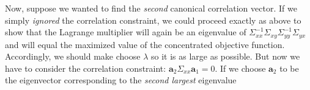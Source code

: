 \documentclass[12pt]{article}
\theoremstyle{definition}
\begin{document}
Now, suppose we wanted to find the \emph{second} canonical correlation vector. If we simply \emph{ignored} the correlation constraint, we could proceed exactly as above to show that the Lagrange multiplier will again be an eigenvalue of $\Sigma_{xx}^{-1}\Sigma_{xy}\Sigma_{yy}^{-1} \Sigma_{yx}$ and will equal the maximized value of the concentrated objective function. Accordingly, we should make choose $\lambda$ so it is as large as possible. But now we have to consider the correlation constraint: $\mathbf{a}_2 \Sigma_{xx}\mathbf{a}_1 = 0$. If we choose $\mathbf{a}_2$ to be the eigenvector corresponding to the \emph{second largest} eigenvalue 
\end{document}
